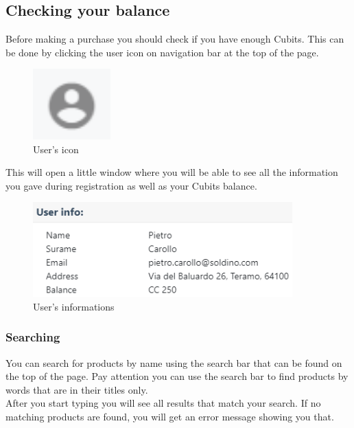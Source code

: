 		\subsection{Checking your balance}
		Before making a purchase you should check if you have enough Cubits\glo.
		This can be done by clicking the user icon on navigation bar at the top 
		of the page.
		\begin{figure}[H]
			\includegraphics[width=3cm]{res/images/user_icon.png}
			\centering
			\caption{User's icon}
		\end{figure}
		\noindent This will open a little window where you will be able to see 
		all the information you gave during registration as well as your Cubits 
		balance.
		\begin{figure}[H]
			\includegraphics[width=10cm]{res/images/user_info.png}
			\centering
			\caption{User's informations}
		\end{figure}
		\subsubsection{Searching}
		You can search for products by name using the search bar that can be 
		found on the top of the page. Pay attention you can use the search bar 
		to find products by words that are in their titles only. \\
		After you start typing you will see 
		all results that match your search. If no matching products are found, 
		you will get an error message showing you that.
%		
